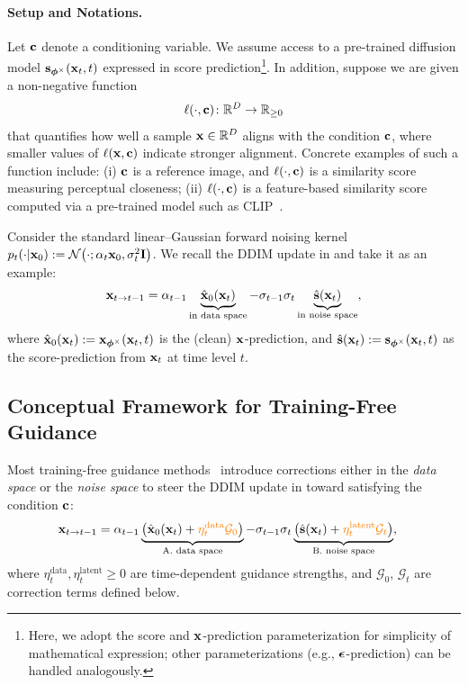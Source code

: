 \paragraph{Setup and Notations.} Let ${\mathbf{c}}$ denote a conditioning variable. We assume access to a pre-trained diffusion model ${\mathbf{s}}_{\bm{\phi}^\times}({\mathbf{x}}_t, t)$ expressed in score prediction\footnote{Here, we adopt the score and ${\mathbf{x}}$-prediction parameterization for simplicity of mathematical expression; other parameterizations (e.g., ${\bm{\epsilon}}$-prediction) can be handled analogously.}. In addition, suppose we are given a non-negative function 
\[
\ell(\cdot, {\mathbf{c}}) \colon \mathbb{R}^D \to \mathbb{R}_{\geq 0}
\]
that quantifies how well a sample ${\mathbf{x}} \in \mathbb{R}^D$ aligns with the condition ${\mathbf{c}}$, where smaller values of $\ell({\mathbf{x}}, {\mathbf{c}})$ indicate stronger alignment. Concrete examples of such a function include: (i) ${\mathbf{c}}$ is a reference image, and $\ell(\cdot, {\mathbf{c}})$ is a similarity score measuring perceptual closeness; (ii) $\ell(\cdot, {\mathbf{c}})$ is a feature-based similarity score computed via a pre-trained model such as CLIP~\citep{radford2021learning}.


Consider the standard linear–Gaussian forward noising kernel 
 $p_{t}(\cdot| {\mathbf{x}}_0):=\mathcal{N}\big(\cdot; \alpha_t{\mathbf{x}}_0, \sigma^2_t\mathbf{I}\big)$.
We recall the DDIM update in  and take it as an example:
\begin{align}\label{eq:ddim-update-clean-noise-score}
\begin{aligned}
    {\mathbf{x}}_{t \rightarrow t-1} =\alpha_{t-1} \underbrace{\hat{{\mathbf{x}}}_0({\mathbf{x}}_t)}_{\text{in data space}} - \sigma_{t-1} \sigma_t \underbrace{\hat{{\mathbf{s}}}({\mathbf{x}}_t)}_{\text{in noise space}},
\end{aligned}
\end{align}
where $\hat{{\mathbf{x}}}_0({\mathbf{x}}_t):={\mathbf{x}}_{\bm{\phi}^\times}({\mathbf{x}}_t, t)$ is the (clean) ${\mathbf{x}}$-prediction, and $\hat{{\mathbf{s}}}({\mathbf{x}}_t):={\mathbf{s}}_{\bm{\phi}^\times}({\mathbf{x}}_t, t)$ as the score-prediction from ${\mathbf{x}}_t$ at time level $t$.

\subsection{Conceptual Framework for Training-Free Guidance}\label{subsec:tfg}
Most training-free guidance methods~\citep{ye2024tfg} introduce corrections either in the \emph{data space} or the \emph{noise space} to steer the DDIM update in  toward satisfying the condition ${\mathbf{c}}$:
\begin{align}\label{eq:ddim-update-clean-noise-guide}
\begin{aligned}
    {\mathbf{x}}_{t \rightarrow t-1} &=\alpha_{t-1} \underbrace{\left(\hat{{\mathbf{x}}}_0({\mathbf{x}}_t) + {\color{orange}\eta_t^{\text{data}}\mathcal{G}_0} \right)}_{\text{A. data space}} 
    - \sigma_{t-1} \sigma_t \underbrace{\left(\hat{{\mathbf{s}}}({\mathbf{x}}_t) + {\color{orange}\eta_t^{\text{latent}}\mathcal{G}_t} \right)}_{\text{B. noise space}},
\end{aligned}
\end{align}
where $\eta_t^{\text{data}}, \eta_t^{\text{latent}} \geq 0$ are time-dependent guidance strengths, and $\mathcal{G}_0$, $\mathcal{G}_t$ are correction terms defined below.

